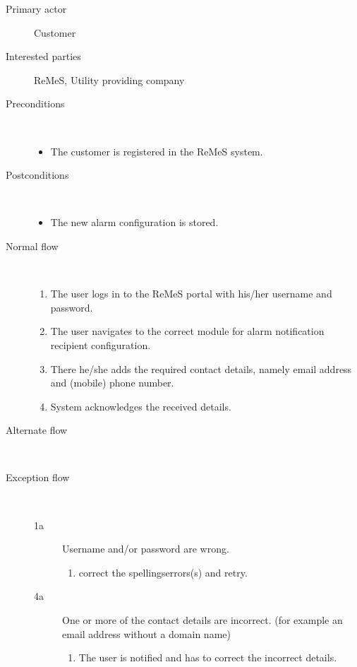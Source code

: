 \begin{description}
	\item[Primary actor] Customer
	\item[Interested parties] ReMeS, Utility providing company
	\item[Preconditions] \ 
	\begin{itemize}
		\item The customer is registered in the ReMeS system.
	\end{itemize}
	\item[Postconditions] \ 
	\begin{itemize}
		\item The new alarm configuration is stored.
	\end{itemize}
	\item[Normal flow] \ 
	\begin{enumerate}
	  	\item The user logs in to the ReMeS portal with his/her username and
	  	password.
	  	\item The user navigates to the correct module for alarm
	  	notification recipient configuration.
	  	\item There he/she adds the required contact details, namely email address
	  	and (mobile) phone number.
	  	\item System acknowledges the received details.
	\end{enumerate}
	\item[Alternate flow] \ 
	\begin{description}
		\item
	\end{description}
	\item[Exception flow] \ 
	\begin{description}
		\item[1a] Username and/or password are wrong.
		\begin{enumerate}
		  \item correct the spellingserrors(s) and retry. %
		\end{enumerate}
		\item[4a] One or more of the contact details are incorrect. (for example an
		email address without a domain name)
		\begin{enumerate}
		  \item The user is notified and has to correct the incorrect details.
		\end{enumerate}
	\end{description}
\end{description}